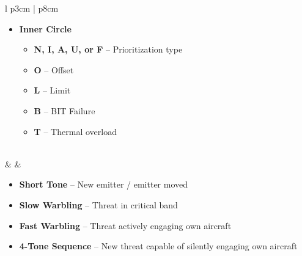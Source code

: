 \documentclass[8pt,usenames,dvipsnames,twoside]{article}
\begin{document}
\begin{center}
\begin{longtable}{l p{3cm} | p{8cm}}
\begin{minipage}[t]{\linewidth}
\begin{itemize}
\begin{itemize}
						\end{itemize}
						\item \textbf{Inner Circle} 
						\begin{itemize}
							\item \textbf{N, I, A, U, or F} -- Prioritization type
							\item \textbf{O} -- Offset
							\item \textbf{L} -- Limit
							\item \textbf{B} -- BIT Failure
							\item \textbf{T} -- Thermal overload
						\end{itemize}
					\end{itemize}
				\end{minipage} \\
				\midrule
				\textbullet &  & 
				\begin{minipage}[t]{\linewidth}
					\vspace{-7pt}
					\begin{itemize}
						\item \textbf{Short Tone} -- New emitter / emitter moved
						\item \textbf{Slow Warbling} -- Threat in critical band
						\item \textbf{Fast Warbling} -- Threat actively engaging own aircraft
						\item \textbf{4-Tone Sequence} -- New threat capable of silently engaging own aircraft 
					\end{itemize}
				\end{minipage} \\
				\bottomrule
			\end{longtable}
		\end{center}
	
		\clearpage
	
\end{document}
